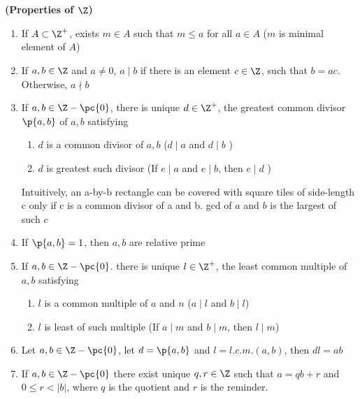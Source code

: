 \documentclass[11pt]{article}
\begin{document}
\newpage
\section{}

\begin{definition*}
    \textbf{(Properties of $\Z$)}
    \begin{enumerate}
        \item {} If $A \subset \Z^+$, exists $m\in A$ such that $m\leq a$ for all $a\in A$ ($m$ is minimal element of $A$)
        \item {} If $a,b\in \Z$ and $a\neq 0$, $a \mid b$ if there is an element $c\in \Z$, such that $b=ac$. Otherwise, $a\nmid b$ 
        \item {} If $a,b\in \Z - \pc{0}$, there is unique $d \in \Z^+$, the greatest common divisor $\p{a,b}$ of $a,b$ satisfying
        \begin{enumerate}
            \item $d$ is a common divisor of $a,b$ ($d\mid a$ and $d\mid b$ )
            \item $d$ is greatest such divisor (If $e \mid a$ and $e\mid b$, then $e\mid d$ )
        \end{enumerate}
        Intuitively, an a-by-b rectangle can be covered with square tiles of side-length c only if c is a common divisor of a and b. gcd of $a$ and $b$ is the largest of such $c$
        \item {} If $\p{a,b}=1$, then $a,b$ are relative prime
        \item {} If $a,b\in \Z - \pc{0}$. there is unique $l\in \Z^+$, the least common multiple of $a,b$ satisfying 
        \begin{enumerate}
            \item $l$ is a common multiple of $a$ and $n$ ($a\mid l$ and $b\mid l$)
            \item $l$ is least of such multiple (If $a\mid m$ and $b\mid m$, then $l\mid m$)
        \end{enumerate} 
        \item {} Let $a,b\in \Z - \pc{0}$, let $d = \p{a,b}$ and $l = l.c.m.(a,b)$, then $dl=ab$
        \item {} If $a,b\in \Z - \pc{0}$ there exist unique $q,r\in \Z$ such that $a=qb+r$ and $0\leq r < |b|$, where $q$ is the quotient and $r$ is the reminder. 

\end{enumerate}
\end{definition*}
\end{document}
